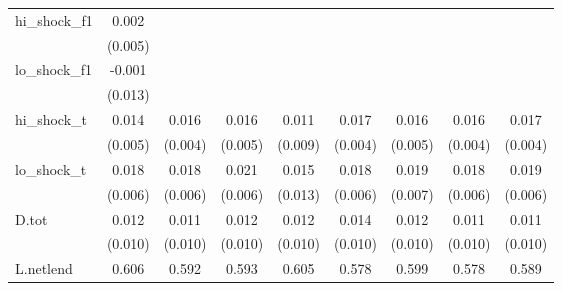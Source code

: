 {\begin{tabular}{l*{8}{c}}
\addlinespace
hi\_shock\_f1 &       0.002         &                     &                     &                     &                     &                     &                     &                     \\
            &     (0.005)         &                     &                     &                     &                     &                     &                     &                     \\
\addlinespace
lo\_shock\_f1 &      -0.001         &                     &                     &                     &                     &                     &                     &                     \\
            &     (0.013)         &                     &                     &                     &                     &                     &                     &                     \\
\addlinespace
hi\_shock\_t  &       0.014\sym{***}&       0.016\sym{***}&       0.016\sym{***}&       0.011         &       0.017\sym{***}&       0.016\sym{***}&       0.016\sym{***}&       0.017\sym{***}\\
            &     (0.005)         &     (0.004)         &     (0.005)         &     (0.009)         &     (0.004)         &     (0.005)         &     (0.004)         &     (0.004)         \\
\addlinespace
lo\_shock\_t  &       0.018\sym{***}&       0.018\sym{***}&       0.021\sym{***}&       0.015         &       0.018\sym{***}&       0.019\sym{**} &       0.018\sym{***}&       0.019\sym{***}\\
            &     (0.006)         &     (0.006)         &     (0.006)         &     (0.013)         &     (0.006)         &     (0.007)         &     (0.006)         &     (0.006)         \\
\addlinespace
D.tot       &       0.012         &       0.011         &       0.012         &       0.012         &       0.014         &       0.012         &       0.011         &       0.011         \\
            &     (0.010)         &     (0.010)         &     (0.010)         &     (0.010)         &     (0.010)         &     (0.010)         &     (0.010)         &     (0.010)         \\
\addlinespace
L.netlend   &       0.606\sym{***}&       0.592\sym{***}&       0.593\sym{***}&       0.605\sym{***}&       0.578\sym{***}&       0.599\sym{***}&       0.578\sym{***}&       0.589\sym{***}\\

\end{tabular}}
